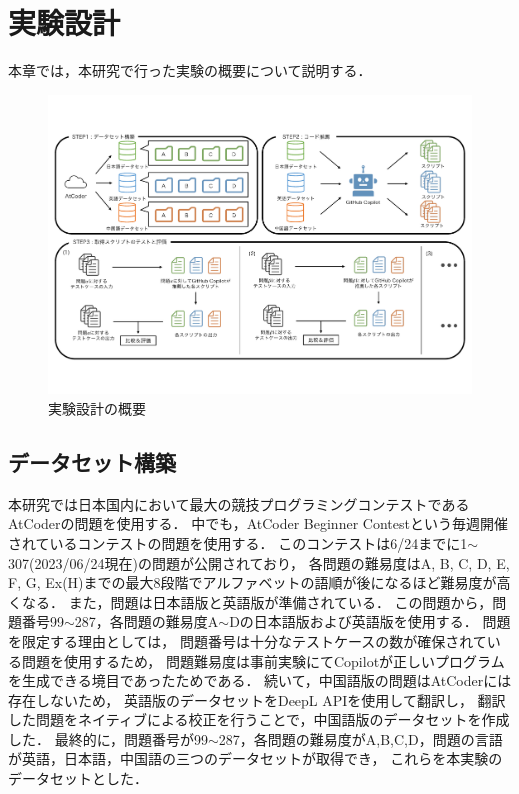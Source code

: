 \section{実験設計\label{approach}}
  本章では，本研究で行った実験の概要について説明する．
  \begin{figure}[t]
    \centering
    \includegraphics[width=\linewidth]{image/system.pdf}
    \caption{実験設計の概要}
    \label{experiment_design}
  \end{figure}
  
  \subsection{データセット構築\label{build_dataset}}
    本研究では日本国内において最大の競技プログラミングコンテストであるAtCoder\cite{AtCoder}の問題を使用する．
    中でも，AtCoder Beginner Contestという毎週開催されているコンテストの問題を使用する．
    このコンテストは6/24までに1${\sim}$307(2023/06/24現在)の問題が公開されており，
    各問題の難易度はA, B, C, D, E, F, G, Ex(H)までの最大8段階でアルファベットの語順が後になるほど難易度が高くなる．
    また，問題は日本語版と英語版が準備されている．
    この問題から，問題番号99${\sim}$287，各問題の難易度A${\sim}$Dの日本語版および英語版を使用する．
    問題を限定する理由としては，
    問題番号は十分なテストケースの数が確保されている問題を使用するため，
    問題難易度は事前実験にてCopilotが正しいプログラムを生成できる境目であったためである．
    続いて，中国語版の問題はAtCoderには存在しないため，
    英語版のデータセットをDeepL APIを使用して翻訳し，
    翻訳した問題をネイティブによる校正を行うことで，中国語版のデータセットを作成した．
    最終的に，問題番号が99${\sim}$287，各問題の難易度がA,B,C,D，問題の言語が英語，日本語，中国語の三つのデータセットが取得でき，
    これらを本実験のデータセットとした．

